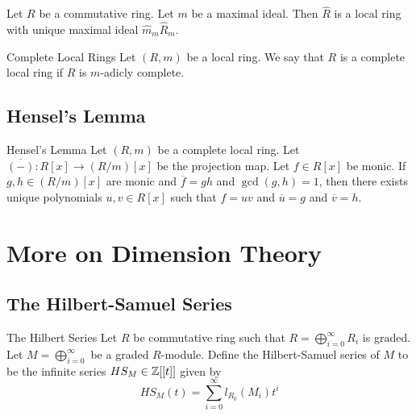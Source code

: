 \documentclass[a4paper]{article}
\begin{document}
\begin{prp}{}{} Let $R$ be a commutative ring. Let $m$ be a maximal ideal. Then $\widehat{R}$ is a local ring with unique maximal ideal $\widehat{m}_m\widehat{R}_m$. 
\end{prp}

\begin{defn}{Complete Local Rings}{} Let $(R,m)$ be a local ring. We say that $R$ is a complete local ring if $R$ is $m$-adicly complete. 
\end{defn}

\subsection{Hensel's Lemma}
\begin{thm}{Hensel's Lemma}{} Let $(R,m)$ be a complete local ring. Let $\overline{(-)}:R[x]\to(R/m)[x]$ be the projection map. Let $f\in R[x]$ be monic. If $g,h\in(R/m)[x]$ are monic and $\overline{f}=gh$ and $\gcd(g,h)=1$, then there exists unique polynomials $u,v\in R[x]$ such that $f=uv$ and $\overline{u}=g$ and $\overline{v}=h$. 
\end{thm}

\pagebreak
\section{More on Dimension Theory}
\subsection{The Hilbert-Samuel Series}
\begin{defn}{The Hilbert Series}{} Let $R$ be commutative ring such that $R=\bigoplus_{i=0}^\infty R_i$ is graded. Let $M=\bigoplus_{i=0}^\infty$ be a graded $R$-module. Define the Hilbert-Samuel series of $M$ to be the infinite series $HS_M\in\mathbb{Z}[[t]]$ given by $$HS_M(t)=\sum_{i=0}^\infty l_{R_0}(M_i)t^i$$
\end{defn}
\end{document}
